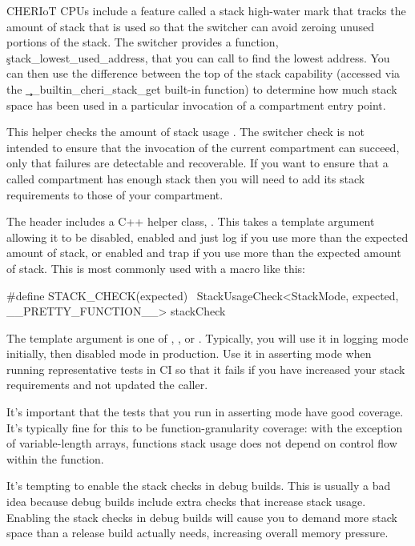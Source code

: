 CHERIoT CPUs include a feature called a stack high-water mark that tracks the amount of stack that is used so that the switcher can avoid zeroing unused portions of the stack.
The switcher provides a function, \c{stack_lowest_used_address}, that you can call to find the lowest address.
You can then use the difference between the top of the stack capability (accessed via the \c{__builtin_cheri_stack_get} built-in function) to determine how much stack space has been used in a particular invocation of a compartment entry point.


\begin{note}
This helper checks the amount of stack usage .
The switcher check is not intended to ensure that the invocation of the current compartment can succeed, only that failures are detectable and recoverable.
If you want to ensure that a called compartment  has enough stack then you will need to add its stack requirements to those of your compartment.
\end{note}

The  header includes a C++ helper class, .
This takes a template argument allowing it to be disabled, enabled and just log if you use more than the expected amount of stack, or enabled and trap if you use more than the expected amount of stack.
This is most commonly used with a macro like this:

\begin{cxxsnippet}
#define STACK_CHECK(expected) \ 
       StackUsageCheck<StackMode, expected, __PRETTY_FUNCTION__> stackCheck
\end{cxxsnippet}

The  template argument is one of , , or .
Typically, you will use it in logging mode initially, then disabled mode in production.
Use it in asserting mode when running representative tests in CI so that it fails if you have increased your stack requirements and not updated the caller.

It's important that the tests that you run in asserting mode have good coverage.
It's typically fine for this to be function-granularity coverage: with the exception of variable-length arrays, functions stack usage does not depend on control flow within the function.

\begin{caution}
It's tempting to enable the stack checks in debug builds.
This is usually a bad idea because debug builds include extra checks that increase stack usage.
Enabling the stack checks in debug builds will cause you to demand more stack space than a release build actually needs, increasing overall memory pressure.
\end{caution}

